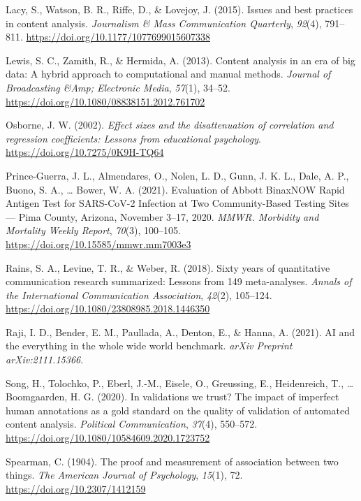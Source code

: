 \documentclass[english,man,floatsintext]{apa6}
\begin{document}
\leavevmode\hypertarget{ref-lacy:2015:IBP}{}%
Lacy, S., Watson, B. R., Riffe, D., \& Lovejoy, J. (2015). Issues and best practices in content analysis. \emph{Journalism \& Mass Communication Quarterly}, \emph{92}(4), 791--811. \url{https://doi.org/10.1177/1077699015607338}

\leavevmode\hypertarget{ref-lewis:2013:CAE}{}%
Lewis, S. C., Zamith, R., \& Hermida, A. (2013). Content analysis in an era of big data: A hybrid approach to computational and manual methods. \emph{Journal of Broadcasting \&Amp; Electronic Media}, \emph{57}(1), 34--52. \url{https://doi.org/10.1080/08838151.2012.761702}

\leavevmode\hypertarget{ref-osborne:2002:ESD}{}%
Osborne, J. W. (2002). \emph{Effect sizes and the disattenuation of correlation and regression coefficients: Lessons from educational psychology}. \url{https://doi.org/10.7275/0K9H-TQ64}

\leavevmode\hypertarget{ref-prince-guerra:2021:EAB}{}%
Prince-Guerra, J. L., Almendares, O., Nolen, L. D., Gunn, J. K. L., Dale, A. P., Buono, S. A., \ldots{} Bower, W. A. (2021). Evaluation of Abbott BinaxNOW Rapid Antigen Test for SARS-CoV-2 Infection at Two Community-Based Testing Sites --- Pima County, Arizona, November 3--17, 2020. \emph{MMWR. Morbidity and Mortality Weekly Report}, \emph{70}(3), 100--105. \url{https://doi.org/10.15585/mmwr.mm7003e3}

\leavevmode\hypertarget{ref-rains:2018:S}{}%
Rains, S. A., Levine, T. R., \& Weber, R. (2018). Sixty years of quantitative communication research summarized: Lessons from 149 meta-analyses. \emph{Annals of the International Communication Association}, \emph{42}(2), 105--124. \url{https://doi.org/10.1080/23808985.2018.1446350}

\leavevmode\hypertarget{ref-raji2021ai}{}%
Raji, I. D., Bender, E. M., Paullada, A., Denton, E., \& Hanna, A. (2021). AI and the everything in the whole wide world benchmark. \emph{arXiv Preprint arXiv:2111.15366}.

\leavevmode\hypertarget{ref-song:2020:ivw}{}%
Song, H., Tolochko, P., Eberl, J.-M., Eisele, O., Greussing, E., Heidenreich, T., \ldots{} Boomgaarden, H. G. (2020). In validations we trust? The impact of imperfect human annotations as a gold standard on the quality of validation of automated content analysis. \emph{Political Communication}, \emph{37}(4), 550--572. \url{https://doi.org/10.1080/10584609.2020.1723752}

\leavevmode\hypertarget{ref-spearman:1904:PMA}{}%
Spearman, C. (1904). The proof and measurement of association between two things. \emph{The American Journal of Psychology}, \emph{15}(1), 72. \url{https://doi.org/10.2307/1412159}
\end{document}

